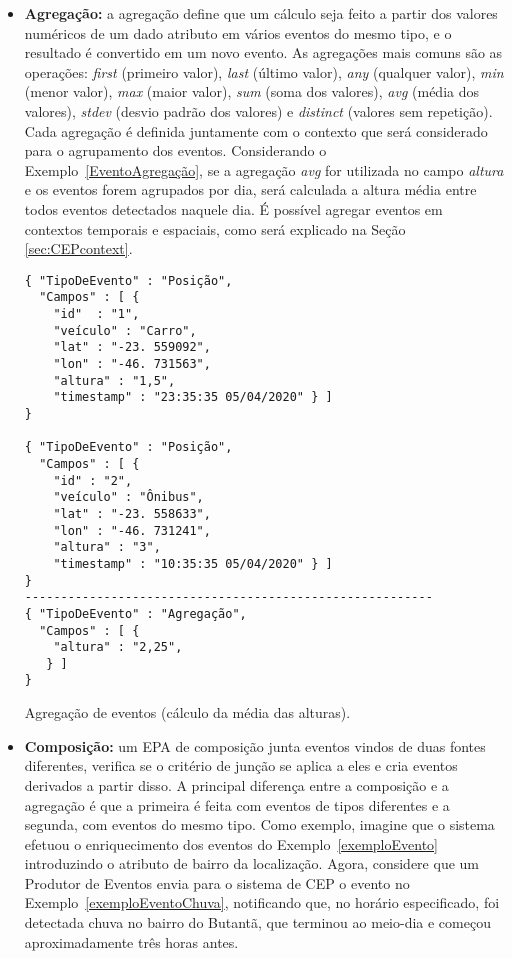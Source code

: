 \begin{itemize}
\item \textbf{Agregação:} a agregação define que um cálculo seja feito a partir dos valores numéricos de um dado atributo em vários eventos do mesmo tipo, e o resultado é convertido em um novo evento. As agregações mais comuns são as operações: \emph{first} (primeiro valor), \emph{last} (último valor), \emph{any} (qualquer valor), \emph{min} (menor valor), \emph{max} (maior valor), \emph{sum} (soma dos valores), \emph{avg} (média dos valores), \emph{stdev} (desvio padrão dos valores) e \emph{distinct} (valores sem repetição). Cada agregação é definida juntamente com o contexto que será considerado para o agrupamento dos eventos. Considerando o Exemplo~\ref{EventoAgregação}, se a agregação \emph{avg} for utilizada no campo \textit{altura} e os eventos forem agrupados por dia, será calculada a altura média entre todos eventos detectados naquele dia. É possível agregar eventos em contextos temporais e espaciais, como será explicado na Seção \ref{sec:CEPcontext}.


\begin{evento}[t]

\begin{verbatim} 
{ "TipoDeEvento" : "Posição",
  "Campos" : [ {
    "id"  : "1",
    "veículo" : "Carro",
    "lat" : "-23. 559092",
    "lon" : "-46. 731563",
    "altura" : "1,5",
    "timestamp" : "23:35:35 05/04/2020" } ]
}

{ "TipoDeEvento" : "Posição",
  "Campos" : [ {
    "id" : "2",
    "veículo" : "Ônibus",
    "lat" : "-23. 558633",
    "lon" : "-46. 731241",
    "altura" : "3",
    "timestamp" : "10:35:35 05/04/2020" } ]
}
---------------------------------------------------------
{ "TipoDeEvento" : "Agregação",
  "Campos" : [ {
    "altura" : "2,25",
   } ]
}
\end{verbatim}
\caption{Agregação de eventos (cálculo da média das alturas).}
\label{EventoAgregação}
\end{evento}


\item \textbf{Composição:} um EPA de composição junta eventos vindos de duas fontes diferentes, verifica se o critério de junção se aplica a eles e cria eventos derivados a partir disso. A principal diferença entre a composição e a agregação é que a primeira é feita com eventos de tipos diferentes e a segunda, com eventos do mesmo tipo. Como exemplo, imagine que o sistema efetuou o enriquecimento dos eventos do Exemplo~\ref{exemploEvento} introduzindo o atributo de bairro da localização. Agora, considere que um Produtor de Eventos envia para o sistema de CEP o evento no Exemplo~\ref{exemploEventoChuva}, notificando que, no horário especificado, foi detectada chuva no bairro do Butantã, que terminou ao meio-dia e começou aproximadamente três horas antes.
\begin{evento}[t]


\end{evento}
\end{itemize}
